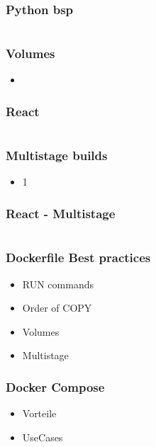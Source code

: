 \documentclass[22pt]{beamer}
\begin{document}
\begin{frame}[fragile]
    \frametitle{Python bsp}
    \inputminted[fontsize=\footnotesize, frame=lines]{dockerfile}{../examples/Dockerfile.cmd}
\end{frame}

\begin{frame}[t]
    \frametitle{Volumes}
    \begin{itemize}
        \item 
    \end{itemize} 
\end{frame}

\begin{frame}[fragile]
    \frametitle{React}
    \inputminted[fontsize=\footnotesize, frame=lines]{dockerfile}{../examples/Dockerfile.cmd}
\end{frame}

\begin{frame}[t]
    \frametitle{Multistage builds}
    \begin{itemize}
        \item 1
    \end{itemize} 
\end{frame}

\begin{frame}[fragile]
    \frametitle{React - Multistage}
    \inputminted[fontsize=\footnotesize, frame=lines]{dockerfile}{../examples/Dockerfile.cmd}
\end{frame}

\begin{frame}[t]
    \frametitle{Dockerfile Best practices}
    \begin{itemize}
        \item RUN commands
        \item Order of COPY
        \item Volumes
        \item Multistage
    \end{itemize} 
\end{frame}

\begin{frame}[t]
    \frametitle{Docker Compose}
    \begin{itemize}
        \item Vorteile
        \item UseCases
    \end{itemize} 
\end{frame}
\end{document}
